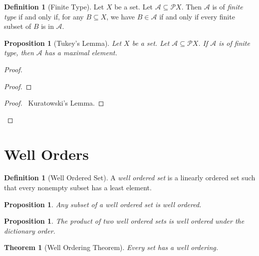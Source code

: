 \documentclass{book}
\let\qed\relax
\newtheorem{prop}[ax]{Proposition}
\newtheorem{thm}[ax]{Theorem}
\theoremstyle{definition}
\newtheorem{df}[ax]{Definition}
\begin{document}
\begin{df}[Finite Type]
Let $X$ be a set. Let $\mathcal{A} \subseteq \mathcal{P} X$. Then $\mathcal{A}$ is of \emph{finite type} if and only if, for any $B \subseteq X$, we have $B \in \mathcal{A}$ if and only if every finite subset of $B$ is in $\mathcal{A}$.
\end{df}

\begin{prop}[Tukey's Lemma]
Let $X$ be a set. Let $\mathcal{A} \subseteq \mathcal{P} X$. If $\mathcal{A}$ is of finite type, then $\mathcal{A}$ has a maximal element.
\end{prop}

\begin{proof}
\pf
{}
\begin{proof}
\end{proof}
\qedstep
\begin{proof}
	\pf\ Kuratowski's Lemma.
\end{proof}
\qed
\end{proof}

\section{Well Orders}

\begin{df}[Well Ordered Set]
A \emph{well ordered set} is a linearly ordered set such that every nonempty subset has a least element.
\end{df}

\begin{prop}
Any subset of a well ordered set is well ordered.
\end{prop}

\begin{prop}
The product of two well ordered sets is well ordered under the dictionary order.
\end{prop}

\begin{thm}[Well Ordering Theorem]
Every set has a well ordering.
\end{thm}
\end{document}
